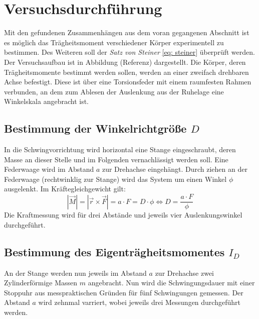 \section{Versuchsdurchführung}
Mit den gefundenen Zusammenhängen aus dem voran gegangenen Abschnitt ist es
möglich das Trägheitsmoment verschiedener Körper experimentell zu bestimmen.
Des Weiteren soll der \textit{Satz von Steiner} \eqref{eq: steiner} überprüft
werden. \\
Der Versuchsaufbau ist in Abbildung (Referenz) dargestellt. Die Körper, deren
Trägheitsmomente bestimmt werden sollen, werden an einer zweifach drehbaren Achse
befestigt. Diese ist über eine Torsionsfeder mit einem raumfesten Rahmen verbunden,
an dem zum Ablesen der Auslenkung aus der Ruhelage eine Winkelskala angebracht ist.

\subsection{Bestimmung der Winkelrichtgröße $D$}
In die Schwingvorrichtung wird horizontal eine Stange eingeschraubt, deren Masse an dieser
Stelle und im Folgenden vernachlässigt werden soll. Eine Federwaage wird im Abstand $a$ zur
Drehachse eingehängt. Durch ziehen an der Federwaage (rechtwinklig zur Stange) wird das System um einen Winkel $\phi$
ausgelenkt. Im Kräftegleichgewicht gilt:
\begin{equation}
  \left| \vec{M} \right| = \left|\vec{r} \times \vec{F} \right| = a \cdot F = D \cdot \phi \iff D = \frac{a \cdot F}{\phi}
\end{equation}
Die Kraftmessung wird für drei Abstände und jeweils vier Auslenkungswinkel durchgeführt.

\subsection{Bestimmung des Eigenträgheitsmomentes $I_D$}
An der Stange werden nun jeweils im Abstand $a$ zur Drehachse zwei Zylinderförmige
Massen $m$ angebracht. Nun wird die Schwingungsdauer mit einer Stoppuhr
aus messpraktischen Gründen für fünf Schwingungen gemessen. Der Abstand $a$ wird zehnmal varriert, wobei jeweils
drei Messungen durchgeführt werden.

